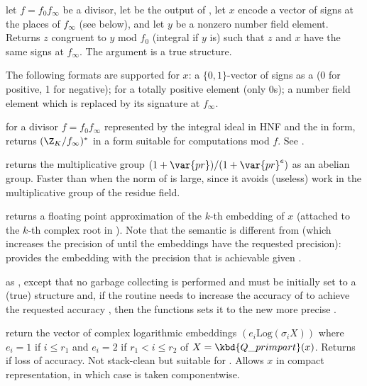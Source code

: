 let $f = f_0f_\infty$ be a divisor, let  be the output of
, let $x$ encode a vector of signs at
the places of $f_\infty$ (see below), and let $y$ be a nonzero
number field element. Returns $z$ congruent to $y$ mod $f_0$ (integral if $y$
is) such that $z$ and $x$ have the same signs at $f_\infty$. The argument
 is a true  structure.

The following formats are supported for $x$: a $\{0,1\}$-vector of signs
as a  (0 for positive, 1 for negative);  for a
totally positive element (only $0$s); a number field element which
is replaced by its signature at $f_\infty$.

 for a divisor $f =
f_0f_\infty$ represented by the integral ideal  in HNF and
the  in  form, returns $(\Z_K/f_\infty)^*$ in a form
suitable for computations mod $f$. See .

 returns the
multiplicative group $(1 + \var{pr}) / (1 + \var{pr}^e)$ as an abelian group.
Faster than  when the norm of  is large, since it
avoids (useless) work in the multiplicative group of the residue field.


 returns a floating point
approximation of the $k$-th embedding of $x$ (attached to the $k$-th
complex root in ). Note that the semantic is different from
 (which increases the precision of  until the
embeddings have the requested precision):  provides the
embedding with the precision that is achievable given .

as , except that no garbage collecting is performed and
 must be initially set to a (true)  structure and,
if the routine needs to increase the accuracy of  to achieve the
requested accuracy , then the functions sets it to the new more
precise .

 return the vector of complex
logarithmic embeddings $(e_i \text{Log}(\sigma_i X))$ where $e_i = 1$ if $i \leq
r_1$ and $e_i = 2$ if $r_1 < i \leq r_2$ of $X = \kbd{Q\_primpart}(x)$.
Returns  if loss of accuracy. Not stack-clean but suitable
for . Allows $x$ in compact representation, in which
case  is taken componentwise.

